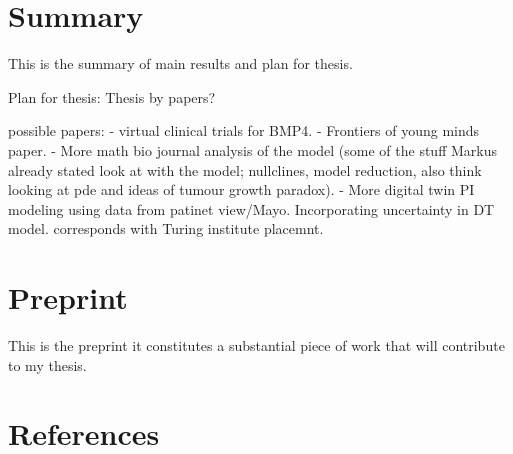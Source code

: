 \documentclass[
  letterpaper,
]{scrreprt}
\theoremstyle{definition}
\theoremstyle{remark}
\begin{document}

\chapter{Summary}\label{summary}

This is the summary of main results and plan for thesis.

Plan for thesis: Thesis by papers?

possible papers: - virtual clinical trials for BMP4. - Frontiers of
young minds paper. - More math bio journal analysis of the model (some
of the stuff Markus already stated look at with the model; nullclines,
model reduction, also think looking at pde and ideas of tumour growth
paradox). - More digital twin PI modeling using data from patinet
view/Mayo. Incorporating uncertainty in DT model. corresponds with
Turing institute placemnt.


\chapter{Preprint}\label{preprint}

This is the preprint it constitutes a substantial piece of work that
will contribute to my thesis.


\chapter*{References}\label{references}

\end{document}
